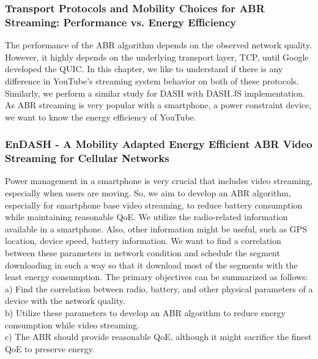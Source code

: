 \subsubsection{Transport Protocols and Mobility Choices for ABR Streaming: Performance vs. Energy Efficiency}
The performance of the ABR algorithm depends on the observed network quality. However, it highly depends on the underlying transport layer, TCP, until Google developed the QUIC. In this chapter, we like to understand if there is any difference in YouTube's streaming system behavior on both of these protocols. Similarly, we perform a similar study for DASH with DASH.JS implementation. As ABR streaming is very popular with a smartphone, a power constraint device, we want to know the energy efficiency of YouTube.

\subsubsection{EnDASH - A Mobility Adapted Energy Efficient ABR Video Streaming for Cellular Networks}
Power management in a smartphone is very crucial that includes video streaming, especially when users are moving. So, we aim to develop an ABR algorithm, especially for smartphone base video streaming, to reduce battery consumption while maintaining reasonable QoE. We utilize the radio-related information available in a smartphone. Also, other information might be useful, such as GPS location, device speed, battery information. We want to find a correlation between these parameters in network condition and schedule the segment downloading in such a way so that it download most of the segments with the least energy consumption. The primary objectives can be summarized as follows:\\
a) Find the correlation between radio, battery, and other physical parameters of a device with the network quality.\\
b) Utilize these parameters to develop an ABR algorithm to reduce energy consumption while video streaming.\\
c) The ABR should provide reasonable QoE, although it might sacrifice the finest QoE to preserve energy.

